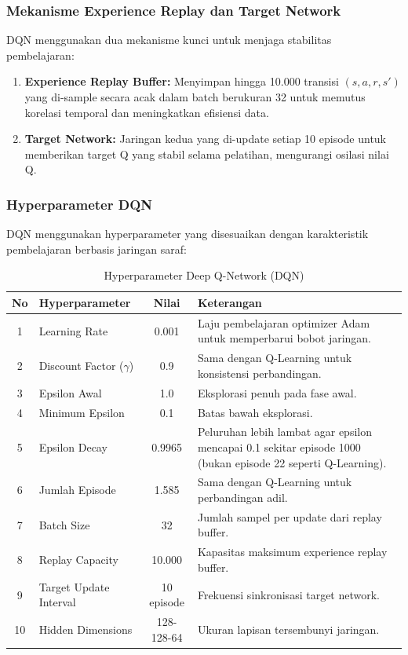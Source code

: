 \subsubsection{Mekanisme Experience Replay dan Target Network}

DQN menggunakan dua mekanisme kunci untuk menjaga stabilitas pembelajaran:
\begin{enumerate}
    \item \textbf{Experience Replay Buffer:} Menyimpan hingga 10.000 transisi $(s, a, r, s')$ yang di-sample secara acak dalam batch berukuran 32 untuk memutus korelasi temporal dan meningkatkan efisiensi data.
    \item \textbf{Target Network:} Jaringan kedua yang di-update setiap 10 episode untuk memberikan target Q yang stabil selama pelatihan, mengurangi osilasi nilai Q.
\end{enumerate}

\subsubsection{Hyperparameter DQN}

DQN menggunakan hyperparameter yang disesuaikan dengan karakteristik pembelajaran berbasis jaringan saraf:

\begin{table}[H]
\centering
\begin{tabular}{|c|l|c|p{7cm}|}
\hline
\textbf{No} & \textbf{Hyperparameter} & \textbf{Nilai} & \textbf{Keterangan} \\ \hline
1 & Learning Rate & 0.001 & Laju pembelajaran optimizer Adam untuk memperbarui bobot jaringan. \\ \hline
2 & Discount Factor ($\gamma$) & 0.9 & Sama dengan Q-Learning untuk konsistensi perbandingan. \\ \hline
3 & Epsilon Awal & 1.0 & Eksplorasi penuh pada fase awal. \\ \hline
4 & Minimum Epsilon & 0.1 & Batas bawah eksplorasi. \\ \hline
5 & Epsilon Decay & 0.9965 & Peluruhan lebih lambat agar epsilon mencapai 0.1 sekitar episode 1000 (bukan episode 22 seperti Q-Learning). \\ \hline
6 & Jumlah Episode & 1.585 & Sama dengan Q-Learning untuk perbandingan adil. \\ \hline
7 & Batch Size & 32 & Jumlah sampel per update dari replay buffer. \\ \hline
8 & Replay Capacity & 10.000 & Kapasitas maksimum experience replay buffer. \\ \hline
9 & Target Update Interval & 10 episode & Frekuensi sinkronisasi target network. \\ \hline
10 & Hidden Dimensions & 128-128-64 & Ukuran lapisan tersembunyi jaringan. \\ \hline
\end{tabular}
\caption{Hyperparameter Deep Q-Network (DQN)}
\label{tab:hyperparameter_dqn}
\end{table}

